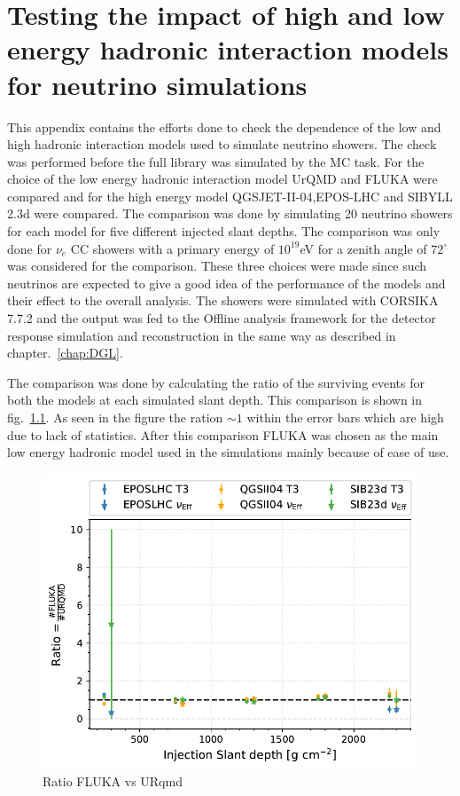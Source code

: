 \chapter{Testing the impact of high and low energy hadronic interaction models for neutrino simulations}
\label{sec:app_2}
This appendix contains the efforts done to check the dependence of the low and high hadronic interaction models used to simulate neutrino showers. The check was performed before the full library was simulated by the MC task. For the choice of the low energy hadronic interaction model UrQMD and FLUKA were compared and for the high energy model QGSJET-II-04,EPOS-LHC and SIBYLL 2.3d  were compared. The comparison was done by simulating 20 neutrino showers for each model for five different injected slant depths. The comparison was only done for $\nu_e$ CC showers with a primary energy of $10^{19}$eV for a zenith angle of $72^\circ$ was considered for the comparison. These three choices were made since such neutrinos are expected to give a good idea of the performance of the models and their effect to the overall analysis. The showers were simulated with CORSIKA 7.7.2 and the output was fed to the Offline analysis framework for the detector response simulation and reconstruction in the same way as described in chapter.~\ref{chap:DGL}. 

The comparison was done by calculating the ratio of the surviving events for both the models at each simulated slant depth. This comparison is shown in fig.~\ref{fig:Efficiency_vs_slant_comp_FLUKAnURQMD}. As seen in the figure the ration $\sim 1$ within the error bars which are high due to lack of statistics. After this comparison FLUKA was chosen as the main low energy hadronic model used in the simulations mainly because of ease of use. 

\begin{figure}[ht!]
  \centering
  \includegraphics[width=\textwidth]{thesis_figures/App2/Efficiency_vs_slant_comp_FLUKAnURQMD.pdf}
  \caption{Ratio FLUKA vs URqmd}
  \label{fig:Efficiency_vs_slant_comp_FLUKAnURQMD}
\end{figure}



